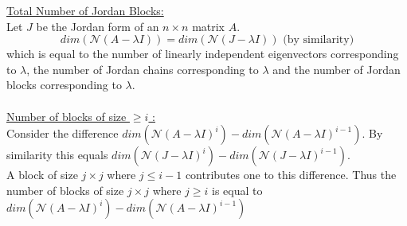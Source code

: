 \documentclass{report}
\begin{document}
 \underline{Total Number of Jordan Blocks:} \\
 Let $ J$ be the Jordan form of an  $n \times n$  matrix $ A$.\\
 \[
 dim \left( \mathcal{N} \left( A - \lambda I \right)  \right) = dim \left( \mathcal{N} \left( J - \lambda I \right)  \right) \text{ (by similarity)}
 \] 
 which is equal to the number of linearly independent eigenvectors corresponding to $ \lambda$, the number of Jordan chains corresponding to $ \lambda$ and the number of Jordan blocks corresponding to $ \lambda$.\\
 \\
 \underline{Number of blocks of size $ \ge i$ :} \\
 Consider the difference $ dim \left( \mathcal{N} \left( A - \lambda I \right) ^{i} \right) - dim \left( \mathcal{N} \left( A - \lambda I \right) ^{i-1} \right) $. By similarity this equals $ dim \left( \mathcal{N} \left( J -  \lambda I \right)^{i}  \right) - dim \left( \mathcal{N} \left( J - \lambda I  \right)^{i-1}  \right)  $.\\
 A block of size $ j \times  j$ where $ j \le i-1$ contributes one to this difference. Thus the number of blocks of size $ j \times  j$ where $ j \ge i$ is equal to  $ dim \left( \mathcal{N} \left( A - \lambda I \right) ^{i} \right) - dim \left( \mathcal{N} \left( A - \lambda I \right) ^{ i -1} \right) $
\end{document}
